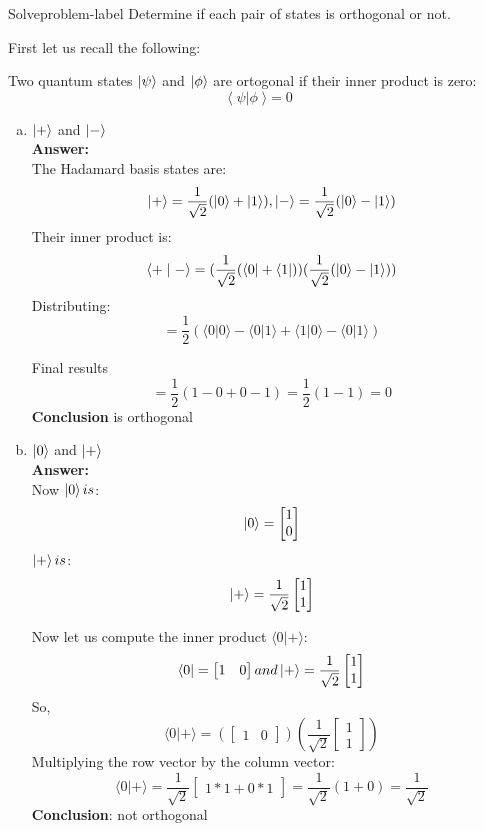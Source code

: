 \begin{problem}{Solve}{problem-label}
Determine if each pair of states is orthogonal or not.

First let us recall the following:

Two quantum states $\ket{\psi}$ and $\ket{\phi}$ are ortogonal if their inner product is zero:
\[
\langle  \;\psi | \phi \; \rangle = 0
\]

\begin{enumerate}[(a)]
    \item $\ket{+}$  and $\ket{-}$\\
   	\textbf{Answer:}\\
   	The Hadamard basis states are:
   	\[
   	\ket{+} = \frac{1}{\sqrt{2}} (\ket{0}+\ket{1}),  \ket{-} = \frac{1}{\sqrt{2}} (\ket{0}-\ket{1})
   	\]
   	Their inner product is:
   	\[
   	\langle + \; | \; - \rangle = (\frac{1}{\sqrt{2}} (\bra{0}+\bra{1})) (\frac{1}{\sqrt{2}} (\ket{0}-\ket{1}))
   	\]
   	Distributing:
   	\[
   	= \frac{1}{2} (\langle 0 | 0\rangle  - \langle 0 | 1\rangle  + \langle 1 | 0\rangle - \langle 0 | 1\rangle)
   	\]
   	
   	Final results
   	\[
	= \frac{1}{2}(1-0+0-1) = \frac{1}{2} (1-1) = 0
	\]
	\textbf{Conclusion} is orthogonal
    \item  $\ket{0}$ and $\ket{+}$ \\
    \textbf{Answer:}\\
    Now $\ket{0} is$:
    \[
    \ket{0}=
    \begin{bmatrix}
    	1\\
    	0
    \end{bmatrix}
    \]
   $\ket{+} is$:
   \[
   \ket{+} = \frac{1}{\sqrt{2}} 
   \begin{bmatrix}
   	1\\
   	1
   \end{bmatrix}
   \]
   
    Now let us compute the inner product $\langle 0 | + \rangle$:\\
    \[
    \bra{0} = 
    \begin{bmatrix}
    	1 & 0
    \end{bmatrix} 
    and 
     \ket{+} = \frac{1}{\sqrt{2}} 
    \begin{bmatrix}
    	1\\
    	1
    \end{bmatrix}
    \]
    So, 
    \[
    \langle 0 | + \rangle = (
    \begin{bmatrix}
    	1 & 0
    \end{bmatrix} 
    )(\frac{1}{\sqrt{2}} 
    \begin{bmatrix}
    	1\\
    	1
    \end{bmatrix}
    )\]
    Multiplying the row vector by the column vector:
    \[
     \langle 0 | + \rangle = \frac{1}{\sqrt{2}} 
     \begin{bmatrix}
     	1 * 1+ 0*1
     \end{bmatrix} = 
     \frac{1}{\sqrt{2}} (1 + 0) = \frac{1}{\sqrt{2}}
    \]
    \textbf{Conclusion}: not orthogonal
    

\end{enumerate}
\end{problem}
